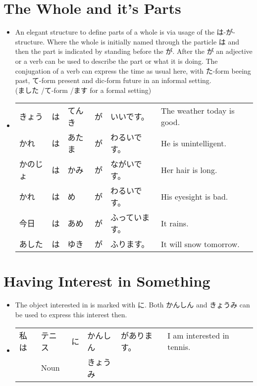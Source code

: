 \documentclass{article}
\begin{document}
\section{The Whole and it's Parts}
\begin{itemize}
\item An elegant structure to define parts of a whole is via usage of the は-が-structure. Where the whole is initially named through the particle は and then the part is indicated by standing before the が. After the が an adjective or a verb can be used to describe the part or what it is doing. The conjugation of a verb can express the time as usual here, with た-form beeing past, て-form present and dic-form future in an informal setting. \\ (ました /て-form /ます for a formal setting)\\
\item \begin{tabular}{ l l l l l l l }
きょう&は&てんき&が&いいです。 & The weather today is good.\\
かれ&は&あたま&が&わるいです。 & He is unintelligent.\\
かのじょ&は&かみ&が&ながいです。 & Her hair is long.\\
かれ&は&め&が&わるいです。 & His eyesight is bad.\\
今日&は&あめ&が&ふっています。 & It rains.\\
あした&は&ゆき&が&ふります。 & It will snow tomorrow.
\end{tabular}
\end{itemize}
\section{Having Interest in Something}
\begin{itemize}
\item The object interested in is marked with に. Both かんしん and きょうみ can be used to express this interest then.
\item \begin{tabular}{ l l l l l l l }
私は&テニス&に&かんしん&があります。 &I am interested in tennis. \\
   &Noun&&きょうみ&&
\end{tabular}
\end{itemize}
\end{document}
